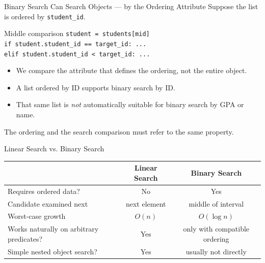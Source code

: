 \documentclass[aspectratio=169,10pt]{beamer}
\begin{document}
\begin{frame}{Binary Search Can Search Objects --- by the Ordering Attribute}
  Suppose the list is ordered by \texttt{student\_id}.

  \begin{block}{Middle comparison}
    \texttt{student = students[mid]}\\
    \texttt{if student.student\_id == target\_id: ...}\\
    \texttt{elif student.student\_id < target\_id: ...}
  \end{block}

  \begin{itemize}
    \item We compare the attribute that defines the ordering, not the entire object.
    \item A list ordered by ID supports binary search by ID.
    \item That same list is \emph{not} automatically suitable for binary search by GPA or name.
  \end{itemize}

  \begin{keyidea}
    The ordering and the search comparison must refer to the same property.
  \end{keyidea}
\end{frame}

\begin{frame}{Linear Search vs. Binary Search}
  \begin{center}
    \renewcommand{\arraystretch}{1.32}
    \begin{tabular}{l|c|c}
      & \textbf{Linear Search} & \textbf{Binary Search} \\\hline
      Requires ordered data? & No & Yes \\
      Candidate examined next & next element & middle of interval \\
      Worst-case growth & $O(n)$ & $O(\log n)$ \\
      Works naturally on arbitrary predicates? & Yes & only with compatible ordering \\
      Simple nested object search? & Yes & usually not directly
    \end{tabular}
  \end{center}
\end{frame}
\end{document}
